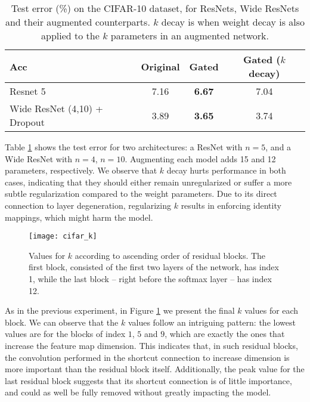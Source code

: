 \documentclass{article} %
\begin{document}
\begin{table}[h!]
\centering
    \begin{tabular}{ | l | c | c | c |}
    \hline
    Acc    & 		  Original & Gated & Gated ($k$ decay)  \\ \hline
    Resnet 5 & 		7.16 & 	\textbf{6.67} &    7.04\\ \hline
    Wide ResNet (4,10) + Dropout &  3.89 & 	\textbf{3.65}   & 3.74 \\ \hline
    \end{tabular}
\caption{Test error (\%) on the CIFAR-10 dataset, for ResNets, Wide ResNets and their augmented counterparts. $k$ decay is when weight decay is also applied to the $k$ parameters in an augmented network.}
    \label{cifar_comp}   
\end{table}


Table \ref{cifar_comp} shows the test error for two architectures: a ResNet with $n = 5$, and a Wide ResNet with $n = 4$, $n = 10$. Augmenting each model adds 15 and 12 parameters, respectively. We observe that $k$ decay hurts performance in both cases, indicating that they should either remain unregularized or suffer a more subtle regularization compared to the weight parameters. Due to its direct connection to layer degeneration, regularizing $k$ results in enforcing identity mappings, which might harm the model.




\begin{figure}[!ht]
  \centering
    \texttt{[image: cifar\_k]}
  \caption{Values for $k$ according to ascending order of residual blocks. The first block, consisted of the first two layers of the network, has index 1, while the last block -- right before the softmax layer -- has index 12.}
\label{cpruning}
\end{figure}



As in the previous experiment, in Figure \ref{cpruning} we present the final $k$ values for each block. We can observe that the $k$ values follow an intriguing pattern: the lowest values are for the blocks of index $1$, $5$ and $9$, which are exactly the ones that increase the feature map dimension. This indicates that, in such residual blocks, the convolution performed in the shortcut connection to increase dimension is more important than the residual block itself. Additionally, the peak value for the last residual block suggests that its shortcut connection is of little importance, and could as well be fully removed without greatly impacting the model.
\end{document}
